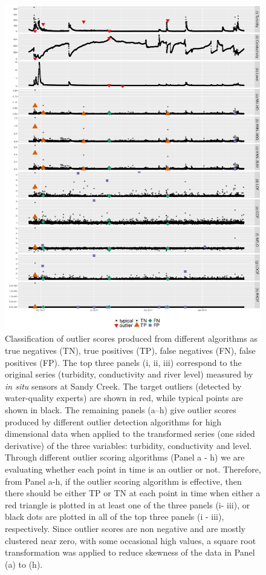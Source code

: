 \documentclass[draft]{agujournal2018} %
\begin{document}
\begin{figure}[H]

{\centering \includegraphics[width=1\linewidth,height=0.8\textheight]{./fig/onesidedderivativeTCLsandy-1.pdf}

}
\caption{Classification of outlier scores produced from different algorithms as true negatives (TN), true positives (TP), false negatives (FN), false positives (FP). The top three panels (i, ii, iii) correspond to the original series (turbidity, conductivity and river level) measured by \textit{in situ} sensors at Sandy Creek. The target outliers (detected by water-quality experts) are shown in red, while typical points are shown in black. The remaining panels (a--h) give outlier scores produced by different outlier detection algorithms for high dimensional data when applied to the transformed series (one sided derivative) of the three variables: turbidity, conductivity and level. \color{black} Through different outlier scoring algorithms (Panel a - h) we are evaluating whether each point in time is an outlier or not. Therefore, from Panel a-h, if the outlier scoring algorithm is effective, then there should be either TP or TN  at each point in time when either a red triangle is plotted in at least one of the three panels (i- iii), or  black dots are plotted  in all of the top three panels (i - iii), respectively. Since outlier scores are non negative and are mostly clustered near zero, with some occasional high values, a square root transformation was applied to reduce skewness of the data in Panel (a) to (h). \color{black}}\label{fig:osDevTCLSandy}
\end{figure}
\end{document}
